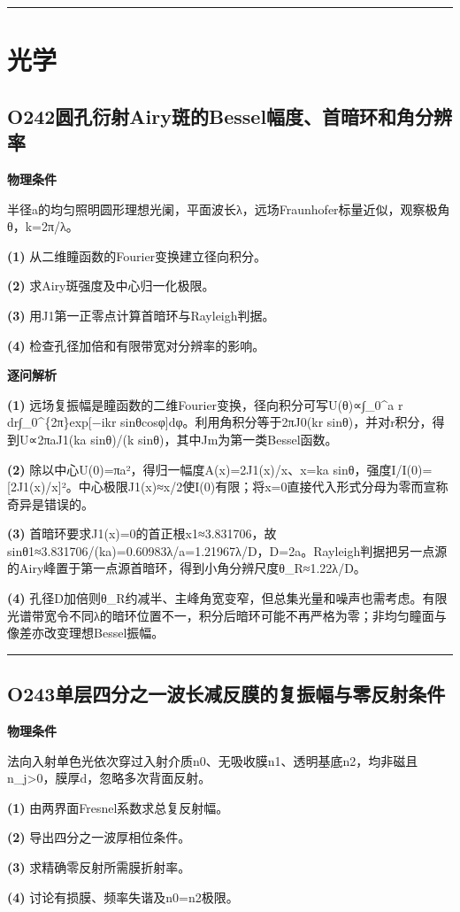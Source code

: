 \documentclass[UTF8,a4paper,11pt,oneside,openany]{ctexbook}
\begin{document}
\par\bigskip\hrule\bigskip
\chapter{光学}
\section*{O242\quad 圆孔衍射Airy斑的Bessel幅度、首暗环和角分辨率}
\textbf{物理条件}\par 半径a的均匀照明圆形理想光阑，平面波长λ，远场Fraunhofer标量近似，观察极角θ，k=2π/λ。
\par\noindent\textbf{(1)} 从二维瞳函数的Fourier变换建立径向积分。
\par\noindent\textbf{(2)} 求Airy斑强度及中心归一化极限。
\par\noindent\textbf{(3)} 用J1第一正零点计算首暗环与Rayleigh判据。
\par\noindent\textbf{(4)} 检查孔径加倍和有限带宽对分辨率的影响。

\par\medskip\noindent\textbf{逐问解析}
\par\noindent\textbf{(1)} 远场复振幅是瞳函数的二维Fourier变换，径向积分可写U(θ)∝∫\_0\textasciicircum{}a r dr∫\_0\textasciicircum{}\{2π\}exp[−ikr sinθcosφ]dφ。利用角积分等于2πJ0(kr sinθ)，并对r积分，得到U∝2πaJ1(ka sinθ)/(k sinθ)，其中Jm为第一类Bessel函数。
\par\noindent\textbf{(2)} 除以中心U(0)=πa²，得归一幅度A(x)=2J1(x)/x、x=ka sinθ，强度I/I(0)=[2J1(x)/x]²。中心极限J1(x)≈x/2使I(0)有限；将x=0直接代入形式分母为零而宣称奇异是错误的。
\par\noindent\textbf{(3)} 首暗环要求J1(x)=0的首正根x1≈3.831706，故sinθ1≈3.831706/(ka)=0.60983λ/a=1.21967λ/D，D=2a。Rayleigh判据把另一点源的Airy峰置于第一点源首暗环，得到小角分辨尺度θ\_R≈1.22λ/D。
\par\noindent\textbf{(4)} 孔径D加倍则θ\_R约减半、主峰角宽变窄，但总集光量和噪声也需考虑。有限光谱带宽令不同λ的暗环位置不一，积分后暗环可能不再严格为零；非均匀瞳面与像差亦改变理想Bessel振幅。

\par\bigskip\hrule\bigskip
\section*{O243\quad 单层四分之一波长减反膜的复振幅与零反射条件}
\textbf{物理条件}\par 法向入射单色光依次穿过入射介质n0、无吸收膜n1、透明基底n2，均非磁且n\_j>0，膜厚d，忽略多次背面反射。
\par\noindent\textbf{(1)} 由两界面Fresnel系数求总复反射幅。
\par\noindent\textbf{(2)} 导出四分之一波厚相位条件。
\par\noindent\textbf{(3)} 求精确零反射所需膜折射率。
\par\noindent\textbf{(4)} 讨论有损膜、频率失谐及n0=n2极限。
\end{document}
